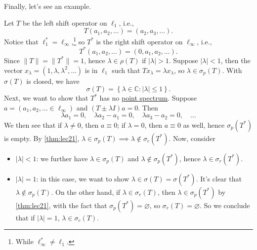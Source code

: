 Finally, let's see an example.

\begin{eg}
	Let \(T\) be the left shift operator on \(\ell _1\), i.e.,
	\[
		T(a_1, a_2, \dots  )= (a_2, a_3, \dots  ).
	\]
	Notice that \(\ell _1^{\ast} = \ell _\infty \),\footnote{While \(\ell ^{\ast} _\infty \neq \ell _1\).} so \(T^{\ast} \) is the right shift operator on \(\ell _\infty \), i.e.,
	\[
		T^{\ast} (a_1, a_2, \dots  ) = (0, a_1, a_2, \dots  ).
	\]
	Since \(\lVert T \rVert = \lVert T^{\ast}  \rVert = 1\), hence \(\lambda \in \rho (T)\) if \(\vert \lambda  \vert > 1\). Suppose \(\vert \lambda  \vert < 1\), then the vector \(x_\lambda = (1, \lambda , \lambda ^{2} , \dots  )\) is in \(\ell _1\) such that \(Tx_\lambda = \lambda x_\lambda \), so \(\lambda \in \sigma _p(T)\). With \(\sigma (T)\) is closed, we have
	\[
		\sigma (T) = \left\{ \lambda \in \mathbb{C} \colon \vert \lambda  \vert \leq 1 \right\} .
	\]
	Next, we want to show that \(T^{\ast} \) has no \hyperref[def:point-spectrum]{point spectrum}. Suppose \(a=(a_1, a_2, \dots  \in \ell _\infty )\) and \((T\pm \lambda I)a=0\). Then
	\[
		\lambda a_1 = 0,\quad
		\lambda a_2 - a_1 = 0,\quad
		\lambda a_3 - a_2 = 0,\quad \dots
	\]
	We then see that if \(\lambda \neq 0\), then \(a\equiv 0\); if \(\lambda = 0\), then \(a\equiv 0\) as well, hence \(\sigma _p(T^{\ast} )\) is empty. By \autoref{thm:lec21}, \(\lambda \in \sigma _p(T) \implies \lambda \notin \sigma _c(T^{\ast} )\). Now, consider
	\begin{itemize}
		\item \(\vert \lambda  \vert < 1\): we further have \(\lambda \in \sigma _p(T)\) and \(\lambda \notin \sigma _p(T^{\ast} )\), hence \(\lambda \in \sigma _r(T^{\ast} )\).
		\item \(\vert \lambda  \vert = 1\): in this case, we want to show \(\lambda \in \sigma (T) = \sigma (T^{\ast} )\). It's clear that \(\lambda \notin \sigma _p(T)\). On the other hand, if \(\lambda \in \sigma _r(T)\), then \(\lambda \in \sigma _p(T^{\ast} )\) by \autoref{thm:lec21}, with the fact that \(\sigma _p(T^{\ast} ) = \varnothing \), so \(\sigma _r(T) = \varnothing \). So we conclude that if \(\vert \lambda \vert = 1\), \(\lambda \in \sigma _c(T)\).


\end{itemize}
\end{eg}
